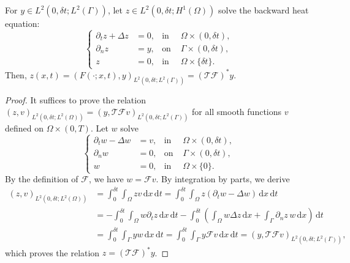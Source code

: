 \documentclass[10pt,a4paper]{amsart}
\begin{document}
\begin{lemma}\label{lemma1}
For $y \in L^{2}(0, \delta t; L^{2}(\Gamma))$, let $z\in L^{2}(0,\delta t;H^{1}(\Omega))$ solve the backward heat equation:
\begin{equation}\label{eqn5}
\left\{
\begin{aligned}
\partial_{t} z + \Delta z &= 0, & \text{in }& \Omega \times (0, \delta t), \\
{\partial_n} z &= y, & \text{on }& \Gamma \times (0, \delta t), \\
z &= 0, & \text{in }& \Omega \times \{\delta t\}.
\end{aligned}
\right.
\end{equation}
Then, $z(x, t) = ( F(\cdot; x, t), y )_{L^{2}(0, \delta t; L^{2}(\Gamma))} = (\mathcal{T}\mathcal{F})^{*} y$.
\end{lemma}

\begin{proof}
It suffices to prove the relation $( z, v )_{L^{2}(0, \delta t; L^{2}(\Omega))} = ( y, \mathcal{T}\mathcal{F} v )_{L^{2}(0, \delta t; L^{2}(\Gamma))}$ for all smooth functions $v$ defined on $\Omega\times(0,T)$.
Let $w$ solve
\begin{equation*}
\left\{
\begin{aligned}
\partial_{t} w - \Delta w &= v, & \text{in }& \Omega \times (0, \delta t), \\
{\partial_n} w &= 0, & \text{on }& \Gamma \times (0, \delta t), \\
w &= 0, & \text{in }& \Omega \times \{0\}.
\end{aligned}
\right.
\end{equation*}
By the definition of $\mathcal{F}$, we have $w = \mathcal{F} v$.
By integration by parts, we derive
\begin{align*}
( z, v )_{L^{2}(0, \delta t; L^{2}(\Omega))} &= \int_{0}^{\delta t} \int_{\Omega} z v \, \mathrm{d}x \, \mathrm{d}t = \int_{0}^{\delta t} \int_{\Omega} z \left(\partial_{t} w - \Delta w\right) \, \mathrm{d}x \, \mathrm{d}t \\
&= -\int_{0}^{\delta t} \int_{\Omega} w \partial_{t} z \, \mathrm{d}x \, \mathrm{d}t - \int_{0}^{\delta t} \left(\int_{\Omega} w \Delta z \, \mathrm{d}x + \int_{ \Gamma} {\partial_n} z \, w \, \mathrm{d}x\right) \, \mathrm{d}t \\
&= \int_{0}^{\delta t} \int_{ \Gamma} y w \, \mathrm{d}x \, \mathrm{d}t = \int_{0}^{\delta t} \int_{ \Gamma} y \mathcal{F} v \, \mathrm{d}x \, \mathrm{d}t
= ( y, \mathcal{T}\mathcal{F} v )_{L^{2}(0, \delta t; L^{2}(\Gamma))},
\end{align*}
which proves the relation $z = (\mathcal{T}\mathcal{F})^{*} y$.
\end{proof}
\end{document}
